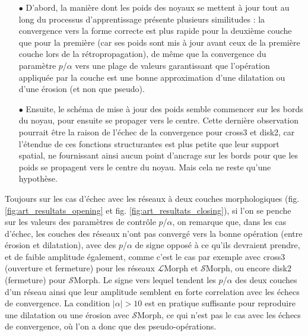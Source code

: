 \vspace{-3.0mm}
\begin{itemize}%
    \item[$\bullet$] D'abord, la manière dont les poids des noyaux se mettent à jour tout au long du processus d'apprentissage présente plusieurs similitudes : la convergence vers la forme correcte est plus rapide pour la deuxième couche que pour la première (car ses poids sont mis à jour avant ceux de la première couche lors de la rétropropagation), de même que la convergence du paramètre $p$/$\alpha$ vers une plage de valeurs garantissant que l'opération appliquée par la couche est une bonne approximation d'une dilatation ou d'une érosion (et non que pseudo).
    \vspace{1.6mm}
    \item[$\bullet$] Ensuite, le schéma de mise à jour des poids semble commencer sur les bords du noyau, pour ensuite se propager vers le centre. Cette dernière observation pourrait être la raison de l'échec de la convergence pour cross3 et disk2, car l'étendue de ces fonctions structurantes est plus petite que leur support spatial, ne fournissant ainsi aucun point d'ancrage sur les bords pour que les poids se propagent vers le centre du noyau. Mais cela ne reste qu'une hypothèse.
\end{itemize}


\newpage

Toujours sur les cas d'échec avec les réseaux à deux couches morphologiques (fig. \ref{fig:art_resultats_opening} et fig. \ref{fig:art_resultats_closing}), si l'on se penche sur les valeurs des paramètres de contrôle $p$/$\alpha$, on remarque que, dans les cas d'échec, les couches des réseaux n'ont pas convergé vers la bonne opération (entre érosion et dilatation), avec des $p$/$\alpha$ de signe opposé à ce qu'ils devraient prendre, et de faible amplitude également, comme c'est le cas par exemple avec cross3 (ouverture et fermeture) pour les réseaux $\mathcal{L}$Morph et $\mathcal{S}$Morph, ou encore disk2 (fermeture) pour $\mathcal{S}$Morph. Le signe vers lequel tendent les $p$/$\alpha$ des deux couches d'un réseau ainsi que leur amplitude semblent en forte correlation avec les échecs de convergence. La condition $|\alpha| > 10$ est en pratique suffisante pour reproduire une dilatation ou une érosion avec $\mathcal{S}$Morph, ce qui n'est pas le cas avec les échecs de convergence, où l'on a donc que des pseudo-opérations. \\


